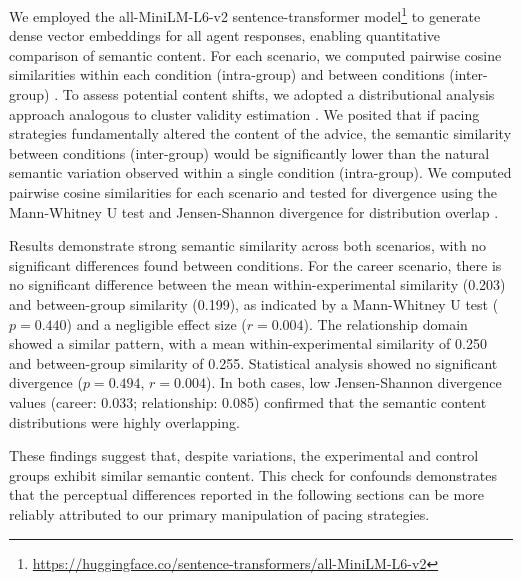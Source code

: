 We employed the all-MiniLM-L6-v2 sentence-transformer model\footnote{\url{https://huggingface.co/sentence-transformers/all-MiniLM-L6-v2}} to generate dense vector embeddings for all agent responses, enabling quantitative comparison of semantic content. For each scenario, we computed pairwise cosine similarities within each condition (intra-group) and between conditions (inter-group) \cite{reimers2019sentence}. 
To assess potential content shifts, we adopted a distributional analysis approach analogous to cluster validity estimation \cite{rousseeuw1987silhouettes}.
We posited that if pacing strategies fundamentally altered the content of the advice, the semantic similarity between conditions (inter-group) would be significantly lower than the natural semantic variation observed within a single condition (intra-group).
We computed pairwise cosine similarities for each scenario and tested for divergence using the Mann-Whitney U test and Jensen-Shannon divergence for distribution overlap \cite{lin2002divergence}.

Results demonstrate strong semantic similarity across both scenarios, with no significant differences found between conditions.
For the career scenario, there is no significant difference between the mean within-experimental similarity (0.203) and between-group similarity (0.199), as indicated by a Mann-Whitney U test ($p=0.440$) and a negligible effect size ($r=0.004$). The relationship domain showed a similar pattern, with a mean within-experimental similarity of 0.250 and between-group similarity of 0.255.
Statistical analysis showed no significant divergence ($p=0.494$, $r=0.004$). In both cases, low Jensen-Shannon divergence values (career: 0.033; relationship: 0.085) confirmed that the semantic content distributions were highly overlapping.

These findings suggest that, despite variations, the experimental and control groups exhibit similar semantic content. This check for confounds demonstrates that the perceptual differences reported in the following sections can be more reliably attributed to our primary manipulation of pacing strategies.
        
